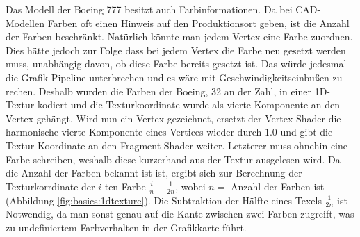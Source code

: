 Das Modell der Boeing 777 besitzt auch Farbinformationen. Da bei CAD-Modellen Farben oft einen Hinweis auf den Produktionsort geben, ist die Anzahl der Farben beschränkt. Natürlich könnte man jedem Vertex eine Farbe zuordnen. Dies hätte jedoch zur Folge dass bei jedem Vertex die Farbe neu gesetzt werden muss, unabhängig davon, ob diese Farbe bereits gesetzt ist. Das würde jedesmal die Grafik-Pipeline unterbrechen und es wäre mit Geschwindigkeitseinbußen zu rechen. Deshalb wurden die Farben der Boeing, 32 an der Zahl, in einer 1D-Textur kodiert und die Texturkoordinate wurde als vierte Komponente an den Vertex gehängt. Wird nun ein Vertex gezeichnet, ersetzt der Vertex-Shader die harmonische vierte Komponente eines Vertices wieder durch $1.0$ und gibt die Textur-Koordinate an den Fragment-Shader weiter. Letzterer muss ohnehin eine Farbe schreiben, weshalb diese kurzerhand aus der Textur ausgelesen wird. Da die Anzahl der Farben bekannt ist ist, ergibt sich zur Berechnung der Texturkorrdinate der $i$-ten Farbe $\frac{i}{n}-\frac{1}{2n}$, wobei $n=$  Anzahl der Farben ist (Abbildung \ref{fig:basics:1dtexture}). Die Subtraktion der Hälfte eines Texels $\frac{1}{2n}$ ist Notwendig, da man sonst genau auf die Kante zwischen zwei Farben zugreift, was zu undefiniertem Farbverhalten in der Grafikkarte führt.

